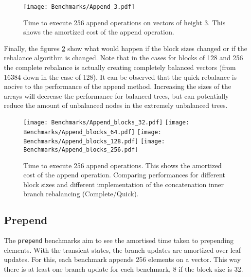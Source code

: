 \begin{figure}[h!]
  \centering
  \texttt{[image: Benchmarks/Append\_3.pdf]}
  \caption{Time to execute 256 append operations on vectors of height 3. This shows the amortized cost of the append operation.}
   \label{Append3Benchmarks}
\end{figure}

\FloatBarrier

Finally, the figures \ref{AppendBlocksBenchmarks} show what would happen if the block sizes changed or if the rebalance algorithm is changed. Note that in the cases for blocks of 128 and 256 the complete rebalance is actually creating completely balanced vectors (from $16384$ down in the case of 128). It can be observed that the quick rebalance is nocive to the performance of the append method. Increasing the sizes of the arrays will decrease the performance for balanced trees, but can potentially reduce the amount of unbalanced nodes in the extremely unbalanced trees.

\begin{figure}[h!]
  \centering
  \texttt{[image: Benchmarks/Append\_blocks\_32.pdf]}
  \texttt{[image: Benchmarks/Append\_blocks\_64.pdf]}
  \texttt{[image: Benchmarks/Append\_blocks\_128.pdf]}
  \texttt{[image: Benchmarks/Append\_blocks\_256.pdf]}
  \caption{Time to execute 256 append operations. This shows the amortized cost of the append operation. Comparing performances for different block sizes and different implementation of the concatenation inner branch rebalancing (Complete/Quick).}
  \label{AppendBlocksBenchmarks}
\end{figure}



\FloatBarrier

\subsection{Prepend}
The \texttt{prepend} benchmarks aim to see the amortised time taken to prepending elements. With the transient states, the branch updates are amortized over leaf updates. For this, each benchmark appends 256 elements on a vector. This way there is at least one branch update for each benchmark, 8 if the block size is 32.


